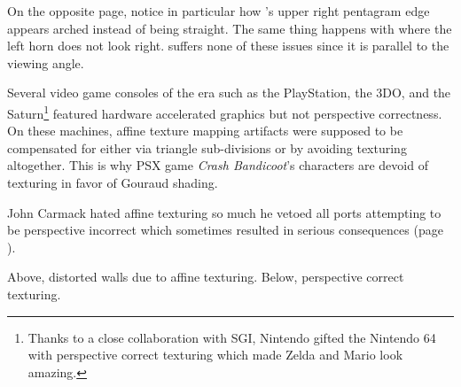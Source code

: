 On the opposite page, notice in particular how 's upper right pentagram edge appears arched instead of being straight. The same thing happens with  where the left horn does not look right.  suffers none of these issues since it is parallel to the viewing angle.\\
\par
Several video game consoles of the era such as the PlayStation, the 3DO, and the Saturn\footnote{Thanks to a close collaboration with SGI, Nintendo gifted the Nintendo 64 with perspective correct texturing which made Zelda and Mario look amazing.} featured hardware accelerated graphics but not perspective correctness. On these machines, affine texture mapping artifacts were supposed to be compensated for either via triangle sub-divisions or by avoiding texturing altogether. This is why PSX game \textit{Crash Bandicoot}'s characters are devoid of texturing in favor of Gouraud shading.\\
\par
John Carmack hated affine texturing so much he vetoed all ports attempting to be perspective incorrect which sometimes resulted in serious consequences (page \pageref{saturn_port}).\par



\par
\vspace{5pt}
Above, distorted walls due to affine texturing. Below, perspective correct texturing.\\
\par
{}

\vspace{-30pt}

